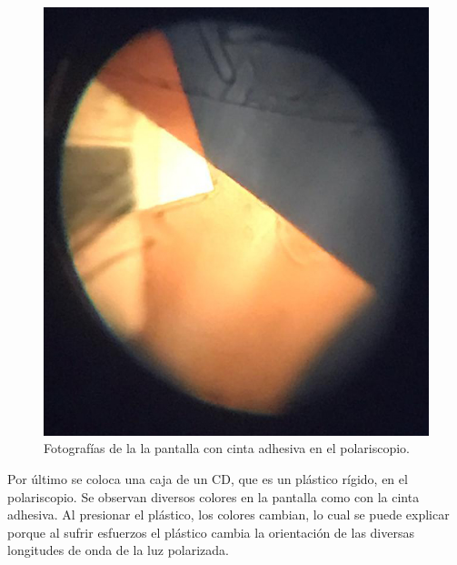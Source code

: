 \documentclass[12pt]{article}
\numberwithin{table}{section}
\numberwithin{figure}{section}
\numberwithin{equation}{section}
\begin{document}
\begin{figure}[!ht]
\begin{minipage}{0.45\textwidth}
		\includegraphics[scale = 0.25]{P5Celo2.jpg}
	\end{minipage}
\caption{Fotografías de la la pantalla con cinta adhesiva en el polariscopio.}\label{P5colorines}
\end{figure}

Por último se coloca una caja de un CD, que es un plástico rígido, en el polariscopio. Se observan diversos colores en la pantalla como con la cinta adhesiva. Al presionar el plástico, los colores cambian, lo cual se puede explicar porque al sufrir esfuerzos el plástico cambia la orientación de las diversas longitudes de onda de la luz polarizada.
\end{document}
